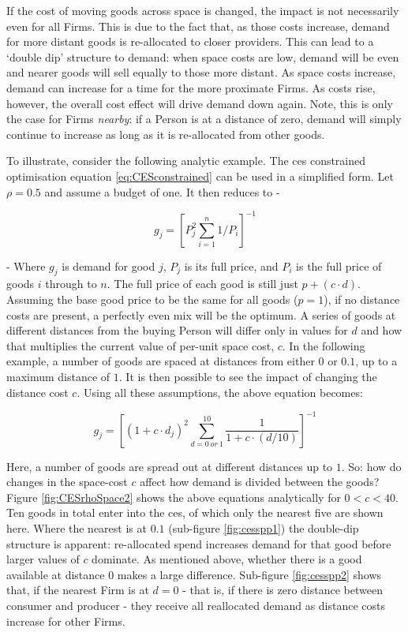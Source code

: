 If the cost of moving goods across space is changed, the impact is not necessarily even for all Firms. This is due to the fact that, as those costs increase, demand for more distant goods is re-allocated to closer providers. This can lead to a `double dip' structure to demand: when space costs are low, demand will be even and nearer goods will sell equally to those more distant. As space costs increase, demand can increase for a time for the more proximate Firms. As costs rise, however, the overall cost effect will drive demand down again. Note, this is only the case for Firms \emph{nearby}: if a Person is at a distance of zero, demand will simply continue to increase as long as it is re-allocated from other goods. 

To illustrate, consider the following analytic example. The \gls{ces} constrained optimisation equation \eqref{eq:CESconstrained} can be used in a simplified form. Let $\rho=0.5$ and assume a budget of one. It then reduces to -

\begin{equation}
g_j = \left[P_j^2 \sum_{i=1}^{n} 1/P_i\right]^{-1}
\label{eq:CESsimpleForSpace}
\end{equation}

- Where $g_j$ is demand for good $j$, $P_j$ is its full price, and $P_i$ is the full price of goods $i$ through to $n$. The full price of each good is still just $p+(c\cdot d)$. Assuming the base good price to be the same for all goods ($p=1$), if no distance costs are present, a perfectly even mix will be the optimum. A series of goods at different distances from the buying Person will differ only in values for $d$ and how that multiplies the current value of per-unit space cost, $c$. In the following example, a number of goods are spaced at distances from either $0$ or $0.1$, up to a maximum distance of $1$. It is then possible to see the impact of changing the distance cost $c$. Using all these assumptions, the above equation becomes:

\begin{equation}
g_j = \left[(1+c\cdot d_j)^2 \sum_{d=0\ or \ 1}^{10} \frac{1}{1+c\cdot(d/10)}\right]^{-1}
\label{eq:CESsimpleForSpace}
\end{equation}

Here, a number of goods are spread out at different distances up to $1$. So: how do changes in the space-cost $c$ affect how demand is divided between the goods? Figure \ref{fig:CESrhoSpace2} shows the above equations analytically for $0<c<40$. Ten goods in total enter into the \gls{ces}, of which only the nearest five are shown here. Where the nearest is at $0.1$ (sub-figure \ref{fig:cesspp1}) the double-dip structure is apparent: re-allocated spend increases demand for that good before larger values of $c$ dominate. As mentioned above, whether there is a good available at distance $0$ makes a large difference. Sub-figure \ref{fig:cesspp2} shows that, if the nearest Firm is at $d=0$ - that is, if there is zero distance between consumer and producer - they receive all reallocated demand as distance costs increase for other Firms.

